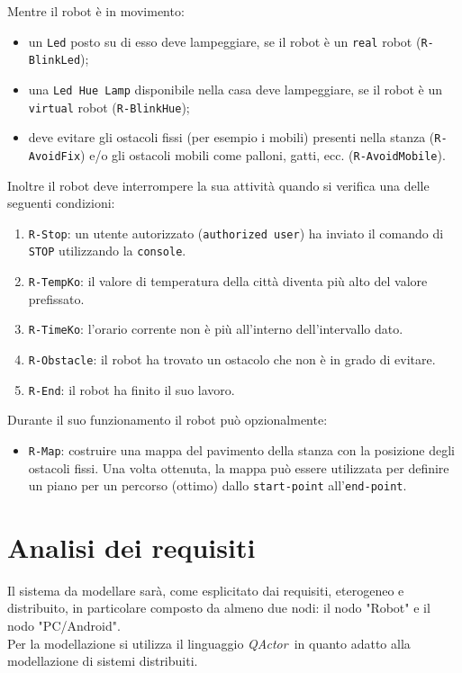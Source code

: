 \documentclass{llncs}
\newcommand{\action}[1]{\texttt{#1}\xspace}
\newcommand{\code}[1]{{\color{blue}\small{\texttt{#1}}}}
\newcommand{\fname}[1]{{\color{magenta}\small{\texttt{#1}}}}
\newcommand{\qa}{\textsf{\textit{QActor}}}
\newcommand{\labelsec}[1]{\label{sec:#1}}
\begin{document}
Mentre il robot è in movimento:
\begin{itemize}
\item un \action{Led} posto su di esso deve lampeggiare, se il robot è un \fname{real} robot (\code{R-BlinkLed});
\item una \action{Led Hue Lamp} disponibile nella casa deve lampeggiare, se il robot è un \fname{virtual} robot (\code{R-BlinkHue});
\item deve evitare gli ostacoli fissi (per esempio i mobili) presenti nella stanza (\code{R-AvoidFix}) e/o gli ostacoli mobili come palloni, gatti, ecc. (\code{R-AvoidMobile}).
\end{itemize}

Inoltre il robot deve interrompere la sua attività quando si verifica una delle seguenti condizioni:
\begin{enumerate}
\item \code{R-Stop}: un utente autorizzato (\code{authorized user}) ha inviato il comando di \action{STOP} utilizzando la \code{console}.
\item \code{R-TempKo}: il valore di temperatura della città diventa più alto del valore prefissato.
\item \code{R-TimeKo}: l'orario corrente non è più all'interno dell'intervallo dato.
\item \code{R-Obstacle}: il robot ha trovato un ostacolo che non è in grado di evitare.
\item \code{R-End}: il robot ha finito il suo lavoro.
\end{enumerate}

Durante il suo funzionamento il robot può opzionalmente:
\begin{itemize}
\item \code{R-Map}: costruire una mappa del pavimento della stanza con la posizione degli ostacoli fissi. Una volta ottenuta, la mappa può essere utilizzata per definire un piano per un percorso (ottimo) dallo \code{start-point} all'\code{end-point}.
\end{itemize}


\section{Analisi dei requisiti}
\labelsec{ReqAnalysis}
Il sistema da modellare sarà, come esplicitato dai requisiti, eterogeneo e distribuito, in particolare composto da almeno due nodi: il nodo "Robot" e il nodo "PC/Android". \\
Per la modellazione si utilizza il linguaggio \qa\ in quanto adatto alla modellazione di sistemi distribuiti. 
\end{document}

